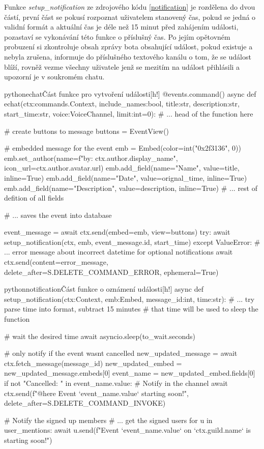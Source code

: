 \documentclass[
  program=inf,
biblatex=false,
sourcecodes=true,
joinlists=true,
  figures=true,
  tables=true,
  glossaries=true,
  index=false
]{kidiplom}
\begin{document}
\newpage
Funkce {\it setup\_notification} ze zdrojového kódu \ref{notification} je rozdělena do dvou částí,
první část se pokusí rozpoznat uživatelem stanovený čas, pokud se jedná o validní formát
a aktuální čas je déle než 15 minut před zahájením události, pozastaví se vykonávání této 
funkce o příslušný čas. Po jejím opětovném probuzení si zkontroluje obsah zprávy bota obsahující
událost, pokud existuje a nebyla zrušena, informuje do příslušného textového kanálu o tom, že se
událost blíží, rovněž vezme všechny uživatele jenž se mezitím na událost přihlásili a upozorní je
v soukromém chatu.

\begin{kicode}{python}{echat}{Část funkce pro vytvoření události}[h!]
  @events.command()
  async def echat(ctx:commands.Context, include_names:bool, 
                  title:str, description:str,
                  start_time:str, voice:VoiceChannel,
                  limit:int=0):
      # ... head of the function here

      # create buttons to message
      buttons = EventView()

      # embedded message for the event
      emb = Embed(color=int("0x2f3136", 0))
      emb.set_author(name=f"by: {ctx.author.display_name}", icon_url=ctx.author.avatar.url)
      emb.add_field(name="Name", value=title, inline=True)
      emb.add_field(name="Date", value=orignal_time, inline=True)
      emb.add_field(name="Description", value=description, inline=True)
      # ... rest of defition of all fields
      
      # ... saves the event into database

      event_message = await ctx.send(embed=emb, view=buttons)
      try:
          await setup_notification(ctx, emb, event_message.id, start_time)
      except ValueError:
          # ... error message about incorrect datetime for optional notifications
          await ctx.send(content=error_message,
                   delete_after=S.DELETE_COMMAND_ERROR, ephemeral=True)
\end{kicode}

\begin{kicode}{python}{notification}{Část funkce o oznámení události}[h!]
async def setup_notification(ctx:Context, emb:Embed, message_id:int, time:str):
    # ... try parse time into format, subtract 15 minutes
    # that time will be used to sleep the function
    
    # wait the desired time
    await asyncio.sleep(to_wait.seconds)
    
    # only notify if the event wasnt cancelled
    new_updated_message = await ctx.fetch_message(message_id)
    new_updated_embed = new_updated_message.embeds[0]
    event_name = new_updated_embed.fields[0]
    if not "Cancelled: " in event_name.value:
        # Notify in the channel
        await ctx.send(f"@here Event `{event_name.value}` starting soon!",
                    delete_after=S.DELETE_COMMAND_INVOKE)
        
        # Notify the signed up members
        # ... get the signed users
        for u in user_mentions:
            await u.send(f"Event `{event_name.value}` on `{ctx.guild.name}` is starting soon!")
\end{kicode}
\end{document}
